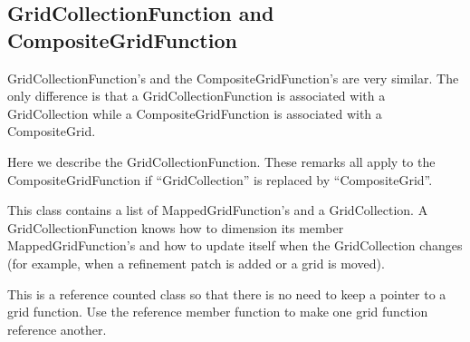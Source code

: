 

\subsection{GridCollectionFunction and CompositeGridFunction}

GridCollectionFunction's and the CompositeGridFunction's
are very similar. The only difference is that a GridCollectionFunction
is associated with a GridCollection while a CompositeGridFunction
is associated with a CompositeGrid.

Here we describe the GridCollectionFunction. These remarks all apply
to the CompositeGridFunction if ``GridCollection'' is replaced
by ``CompositeGrid''.

This class contains a list of MappedGridFunction's
and a GridCollection.
A GridCollectionFunction knows how to dimension its member
MappedGridFunction's and how to update itself when the
GridCollection changes (for example, when a refinement patch
is added or a grid is moved).

This is a reference counted class so that there is no need
to keep a pointer to a grid function. Use the reference
member function to make one grid function reference another.







